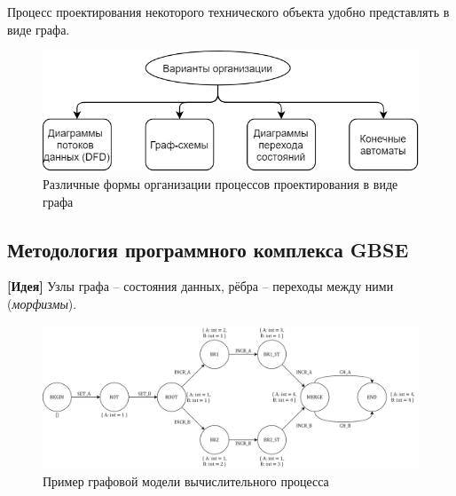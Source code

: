\begin{frame}
  \begin{remark}
    Процесс проектирования некоторого технического объекта удобно представлять в виде графа.
  \end{remark}
  \begin{figure}[!ht]
    \centering
    \includegraphics[width=\textwidth]{images/design_graph_variants.png}
    \caption{Различные формы организации процессов проектирования в виде графа}
    \label{fig:designGraphVariants}
  \end{figure}
\end{frame}
\subsection{Методология программного комплекса GBSE}
\begin{frame}
  \textbf{[Идея]} Узлы графа -- состояния данных, рёбра -- переходы между ними (\emph{морфизмы}).

  \begin{figure}
    \centering
    \includegraphics[width=\textwidth]{images/adot_example.png}
    \caption{Пример графовой модели вычислительного процесса}
    \label{fig:aDotExamplePic}
  \end{figure}
\end{frame}

